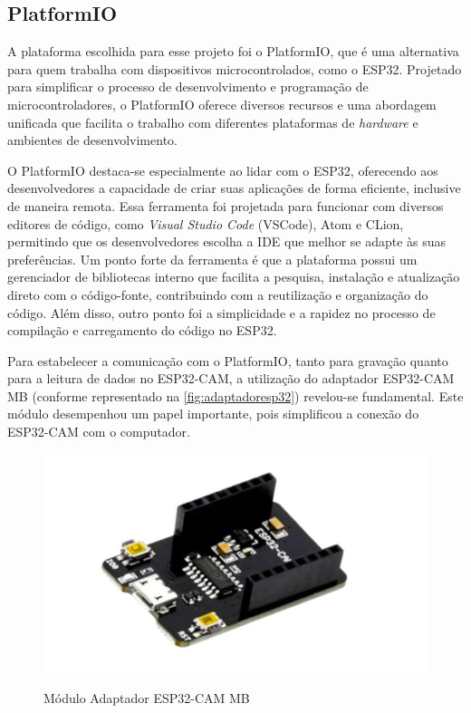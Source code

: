 \subsection{PlatformIO}\label{sec:platformio}

A plataforma escolhida para esse projeto foi o PlatformIO, 
que é uma alternativa para quem trabalha com dispositivos 
microcontrolados, como o ESP32. Projetado para simplificar o processo 
de desenvolvimento e programação de microcontroladores, o PlatformIO 
oferece diversos recursos e uma abordagem unificada que 
facilita o trabalho com diferentes plataformas de \textit{hardware} e 
ambientes de desenvolvimento.

O PlatformIO destaca-se especialmente ao lidar com o ESP32, 
oferecendo aos desenvolvedores a capacidade de criar suas 
aplicações de forma eficiente, inclusive de maneira remota.
Essa ferramenta foi projetada para funcionar com diversos editores de 
código, como \textit{Visual Studio Code} (VSCode), Atom e CLion,  
permitindo que os desenvolvedores escolha a IDE que melhor 
se adapte às suas preferências. Um ponto forte da ferramenta 
é que a plataforma possui um gerenciador de bibliotecas interno que facilita a 
pesquisa, instalação e atualização direto com o código-fonte, contribuindo 
com a reutilização e organização do código. Além disso, outro ponto foi a 
simplicidade e a rapidez no processo de compilação e carregamento do código 
no ESP32.

Para estabelecer a comunicação com o PlatformIO, tanto para gravação quanto para 
a leitura de dados no ESP32-CAM, a utilização do adaptador ESP32-CAM MB 
(conforme representado na \autoref{fig:adaptadoresp32}) revelou-se fundamental. 
Este módulo desempenhou um papel importante, pois simplificou a conexão do ESP32-CAM 
com o computador.

\begin{figure}[h!]
    \centering
    \caption{Módulo Adaptador ESP32-CAM MB}
    \includegraphics[scale=0.25]{figuras/adaptador_esp32cam.png}
    \label{fig:adaptadoresp32}
    \centering
\end{figure}

